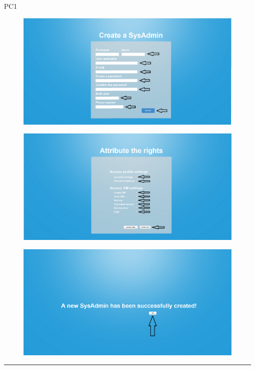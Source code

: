 \begin{lyxlist}{PC1}
\begin{figure}[H]
\centering
\includegraphics[width=170mm]{images/CreateSys2.eps}
\caption{\label{overflow}}
\end{figure}

\begin{figure}[H]
\centering
\includegraphics[width=170mm]{images/CreateSys3.eps}
\caption{\label{overflow}}
\end{figure}

\begin{figure}[H]
\centering
\includegraphics[width=170mm]{images/CreateSys4.eps}
\caption{\label{overflow}}
\end{figure}
\end{lyxlist}
\hrule

















